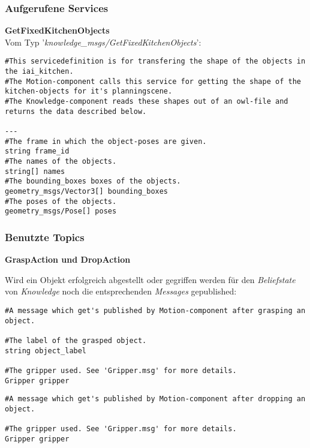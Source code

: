 \documentclass{suturo}
\begin{document}
\subsubsection{Aufgerufene Services}
\textbf{GetFixedKitchenObjects}\\
Vom Typ '\textit{knowledge\_msgs/GetFixedKitchenObjects}': \\ 
\begin{lstlisting}[caption={Definition des GetFixedKitchenObjects-Service},captionpos=b]
#This servicedefinition is for transfering the shape of the objects in the iai_kitchen.
#The Motion-component calls this service for getting the shape of the kitchen-objects for it's planningscene.
#The Knowledge-component reads these shapes out of an owl-file and returns the data described below.

---
#The frame in which the object-poses are given.
string frame_id
#The names of the objects.
string[] names
#The bounding_boxes boxes of the objects.
geometry_msgs/Vector3[] bounding_boxes
#The poses of the objects.
geometry_msgs/Pose[] poses
\end{lstlisting}

\subsubsection{Benutzte Topics}
\textbf{GraspAction und DropAction}

Wird ein Objekt erfolgreich abgestellt oder gegriffen werden für den \textit{Beliefstate} von \textit{Knowledge} noch die entsprechenden \textit{Messages} gepublished: \\

\begin{lstlisting}[caption={Definition der GraspObject.msg},captionpos=b]
#A message which get's published by Motion-component after grasping an object.

#The label of the grasped object.
string object_label

#The gripper used. See 'Gripper.msg' for more details.
Gripper gripper
\end{lstlisting}

\begin{lstlisting}[caption={Definition der DropObject.msg},captionpos=b]
#A message which get's published by Motion-component after dropping an object.

#The gripper used. See 'Gripper.msg' for more details.
Gripper gripper
\end{lstlisting}
\end{document}
